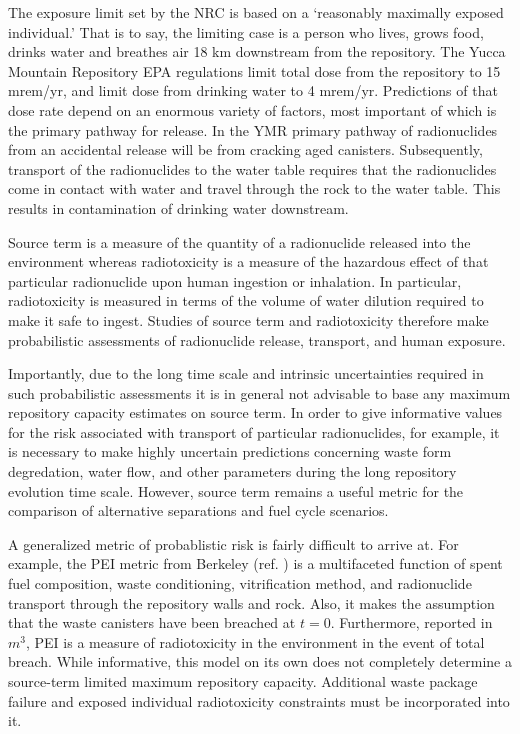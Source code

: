 The exposure limit set by the NRC is based on a `reasonably maximally exposed 
individual.' That is to say, the limiting case is a person who lives, grows 
food, drinks water and breathes air 18 km downstream from the repository. The 
Yucca Mountain Repository \gls{EPA} regulations limit total dose from the 
repository to 15 mrem/yr, and limit dose from drinking water to 4 mrem/yr.  
Predictions of that dose rate depend on an enormous variety of factors, most 
important of which is the primary pathway for release. In the \gls{YMR} primary 
pathway of radionuclides from an accidental release will be from cracking aged 
canisters. Subsequently, transport of the radionuclides to the water table 
requires that the radionuclides come in contact with water and travel through 
the rock to the water table. This results in contamination of drinking water 
downstream.  

Source term is a measure of the quantity of a radionuclide released into the 
environment whereas radiotoxicity is a measure of the hazardous effect of that 
particular radionuclide upon human ingestion or inhalation.  In particular, 
radiotoxicity is measured in terms of the volume of water dilution required to 
make it safe to ingest. Studies of source term and radiotoxicity therefore make 
probabilistic assessments of radionuclide release, transport, and human 
exposure.  

Importantly, due to the long time scale and intrinsic uncertainties required in 
such probabilistic assessments it is in general not advisable to base any 
maximum repository capacity estimates on source term.
In order to give informative values for the risk associated with transport of 
particular radionuclides, for example, it is necessary to make highly uncertain  
predictions concerning waste form degredation, water flow, and other parameters 
during the long repository evolution time scale.  However, source term remains a 
useful metric for the comparison of alternative separations and fuel cycle 
scenarios.


A generalized metric of probablistic risk is fairly difficult to arrive at. For 
example, the \gls{PEI} metric from Berkeley (ref.  
\cite{bouvier_comparison_2007}) is a multifaceted function of spent fuel 
composition, waste conditioning, vitrification method, and radionuclide 
transport through the repository walls and rock.  Also, it makes the assumption 
that the waste canisters have been breached at $t=0$. Furthermore, reported in 
$m^3$, PEI is a measure of radiotoxicity in the environment in the event of 
total breach. While informative, this model on its own does not completely 
determine a source-term limited maximum repository capacity.  Additional waste 
package failure and exposed individual radiotoxicity constraints must be 
incorporated into it.


